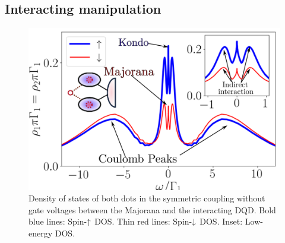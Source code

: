 





\subsection{Interacting manipulation \label{sec:DQD-M-Interacting}}

\begin{figure}[bt]
    \begin{center}
    \includegraphics[scale=0.52]{IMAGES/NRG/NRG-t1=t2.png}
    \caption{  \label{fig:NRG_Majorana}    Density of states of both dots in the symmetric coupling without gate voltages between the Majorana and the interacting DQD. Bold blue lines: Spin-$\uparrow$ DOS. Thin red lines: Spin-$\downarrow$ DOS. Inset: Low-energy DOS.\protect\Source{}
    }
    \end{center}
\end{figure}

